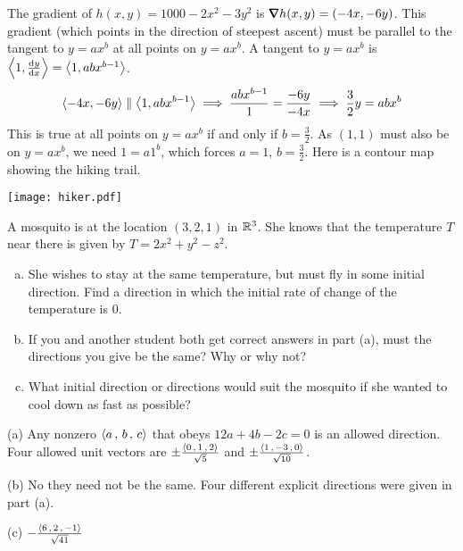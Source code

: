 \begin{solution}
 The gradient of $h(x,y)=1000-2x^2-3y^2$ is 
$\vnabla h(x,y)=(-4x,-6y)$. This gradient (which points in the direction
of steepest ascent) must be parallel to the tangent to $y=ax^b$ at all
points on $y=ax^b$. A tangent to $y=ax^b$ is $\llt 1,\diff{y}{x}\rgt
=\llt 1, abx^{b-1}\rgt$. 
\begin{equation*}
\left< -4x,-6y\right> \parallel \left< 1, abx^{b-1}\right>
\implies \frac{abx^{b-1}}{1}=\frac{-6y}{-4x}
\implies \frac{3}{2}y=abx^b
\end{equation*}
This is true at all points on $y=ax^b$ if and only if $b=\frac{3}{2}$.
As $(1,1)$ must also be on $y=ax^b$, we need $1=a1^b$, which forces
$a=1$, $b=\frac{3}{2}$. Here is a contour map showing the hiking trail.
\begin{center}
     \texttt{[image: hiker.pdf]}
\end{center}
\end{solution}



\begin{question}[M200 2007A] %
A mosquito is at the location $(3, 2, 1)$ in $\mathbb{R}^3$. 
She knows that the temperature $T$ near there is given by 
$T = 2x^2 + y^2 - z^2$.
\begin{enumerate}[(a)]
\item
She wishes to stay at the same temperature, but must fly in some 
initial direction. Find a direction in which the initial rate of 
change of the temperature is $0$.

\item
 If you and another student both get correct answers in part (a), 
must the directions you give be the same? Why or why not?

\item 
What initial direction or directions would suit the mosquito if 
she wanted to cool down as fast as possible?
\end{enumerate}
\end{question}

%

\begin{answer}
(a) Any nonzero $\left< a\,,\,b\,,\,c\right>$ that obeys $12a+4b-2c=0$
is an allowed direction. Four allowed unit vectors are
$\pm\frac{\left< 0\,,\,1\,,\,2\right>}{\sqrt{5}}$ and
$\pm\frac{\left< 1\,,\,-3\,,\,0\right>}{\sqrt{10}}$.

(b) No they need not be the same. Four different explicit directions
     were given in part (a).

(c) $-\frac{\left< 6\,,\,2\,,\,-1\right>}{\sqrt{41}}$
\end{answer}


